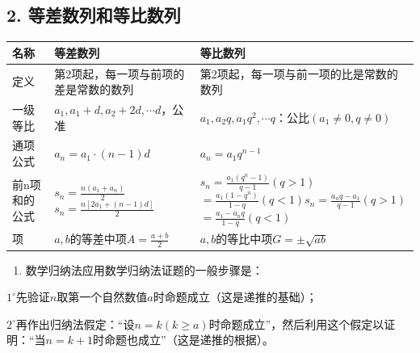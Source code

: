 \subsection{2. 等差数列和等比数列}

{\def\LTcaptype{none} %
\begin{longtable}[]{@{}
  >{\raggedright\arraybackslash}p{}
  >{\raggedright\arraybackslash}p{}
  >{\raggedright\arraybackslash}p{}@{}}
\toprule\noalign{}
\begin{minipage}[b]{\linewidth}\raggedright
名称
\end{minipage} & \begin{minipage}[b]{\linewidth}\raggedright
等差数列
\end{minipage} & \begin{minipage}[b]{\linewidth}\raggedright
等比数列
\end{minipage} \\
\midrule\noalign{}
\endhead
\bottomrule\noalign{}
\endlastfoot
定义 & 第2项起，每一项与前项的差是常数的数列 &
第2项起，每一项与前一项的比是常数的数列 \\
一级等比 & \(a_1, a_1 + d, a_2 + 2d, \cdots\)\(d\)，公准 &
\(a_1, a_2q, a_1q^2, \cdots\)\(q\)：公比\((a_1 \neq 0, q \neq 0)\) \\
通项公式 & \(a_n = a_1 \cdot (n-1)d\) & \(a_n = a_1q^{n-1}\) \\
前n项和的公式 &
\(s_n = \frac{n(a_1 + a_n)}{2}\)\(s_n = \frac{n[2a_1 + (n-1)d]}{2}\) &
\(s_n = \frac{a_1(q^n-1)}{q-1} (q>1)\)\(= \frac{a_1(1-q^n)}{1-q} (q<1)\)\(s_n = \frac{a_n q - a_1}{q-1} (q>1)\)\(= \frac{a_1 - a_n q}{1-q} (q<1)\) \\
项 & \(a, b\)的等差中项\(A = \frac{a + b}{2}\) &
\(a, b\)的等比中项\(G = \pm \sqrt{ab}\) \\
\end{longtable}
}

\begin{enumerate}[start=3]
\item
  数学归纳法应用数学归纳法证题的一般步骤是：
\end{enumerate}

\(1^{\circ}\)先验证\(n\)取第一个自然数值\(a\)时命题成立（这是递推的基础）；

\(2^{\circ}\)再作出归纳法假定：``设\(n = k (k \geqslant a)\)时命题成立''，然后利用这个假定以证明：``当\(n = k + 1\)时命题也成立''（这是递推的根据）。

